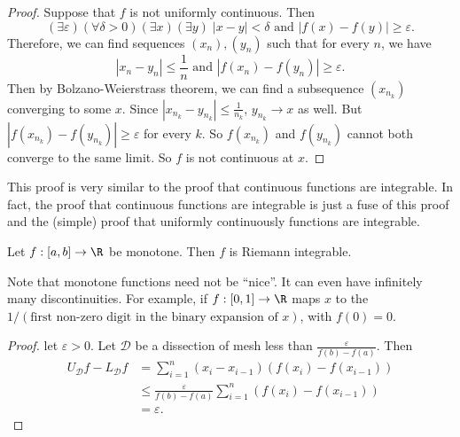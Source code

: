 \documentclass[a4paper]{article}
\begin{document}
\begin{proof}
  Suppose that $f$ is not uniformly continuous. Then
  \[
    (\exists \varepsilon)(\forall \delta > 0)(\exists x)(\exists y)\;|x - y| < \delta \text{ and } |f(x) - f(y)| \geq \varepsilon.
  \]
  Therefore, we can find sequences $(x_n), (y_n)$ such that for every $n$, we have
  \[
    |x_n - y_n| \leq \frac{1}{n}\text{ and }|f(x_n) - f(y_n)| \geq \varepsilon.
  \]
  Then by Bolzano-Weierstrass theorem, we can find a subsequence $(x_{n_k})$ converging to some $x$. Since $|x_{n_k} - y_{n_k}| \leq \frac{1}{n_k}$, $y_{n_k}\to x$ as well. But $|f(x_{n_k}) - f(y_{n_k})| \geq \varepsilon$ for every $k$. So $f(x_{n_k})$ and $f(y_{n_k})$ cannot both converge to the same limit. So $f$ is not continuous at $x$.
\end{proof}
This proof is very similar to the proof that continuous functions are integrable. In fact, the proof that continuous functions are integrable is just a fuse of this proof and the (simple) proof that uniformly continuously functions are integrable.

\begin{thm}
  Let $f: [a, b] \to \R$ be monotone. Then $f$ is Riemann integrable.
\end{thm}
Note that monotone functions need not be ``nice''. It can even have infinitely many discontinuities. For example, if $f: [0, 1] \to \R$ maps $x$ to the $1/(\text{first non-zero digit in the binary expansion of }x)$, with $f(0) = 0$.

\begin{proof}
  let $\varepsilon > 0$. Let $\mathcal{D}$ be a dissection of mesh less than $\frac{\varepsilon}{f(b) - f(a)}$. Then
  \begin{align*}
    U_\mathcal{D} f - L_\mathcal{D}f &= \sum_{i = 1}^n (x_i - x_{i - 1})(f(x_i) - f(x_{i - 1}))\\
    &\leq \frac{\varepsilon}{f(b) - f(a)} \sum_{i = 1}^n (f(x_i) - f(x_{i - 1}))\\
    &= \varepsilon.
  \end{align*}
\end{proof}
\end{document}
